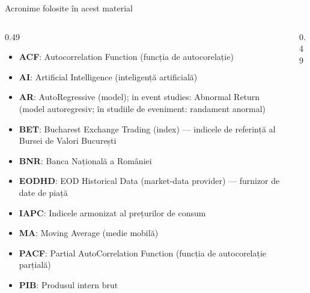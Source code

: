 {
\begin{frame}[noframenumbering]
    \titlepage
\end{frame}
}
\begin{frame}{Acronime folosite în acest material}
\begin{columns}[T]
\begin{column}{0.49\textwidth}
\begin{itemize}\setlength{\itemsep}{0pt}
    \item \textbf{ACF}: Autocorrelation Function (funcția de autocorelație)
    \item \textbf{AI}: Artificial Intelligence (inteligență artificială)
    \item \textbf{AR}: AutoRegressive (model); in event studies: Abnormal Return (model autoregresiv; în studiile de eveniment: randament anormal)
    \item \textbf{BET}: Bucharest Exchange Trading (index) — indicele de referință al Bursei de Valori București
    \item \textbf{BNR}: Banca Națională a României
    \item \textbf{EODHD}: EOD Historical Data (market-data provider) — furnizor de date de piață
    \item \textbf{IAPC}: Indicele armonizat al prețurilor de consum
    \item \textbf{MA}: Moving Average (medie mobilă)
    \item \textbf{PACF}: Partial AutoCorrelation Function (funcția de autocorelație parțială)
    \item \textbf{PIB}: Produsul intern brut
\end{itemize}
\end{column}
\begin{column}{0.49\textwidth}
\end{column}
\end{columns}
\end{frame}

